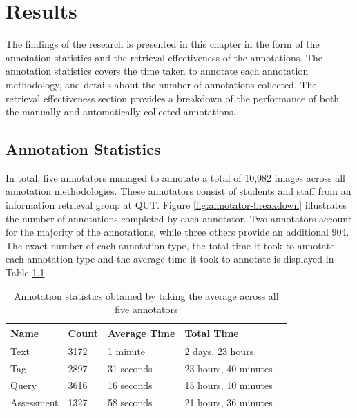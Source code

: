 \chapter{Results}\label{chapter:results}

The findings of the research is presented in this chapter in the form of the annotation statistics and the retrieval effectiveness of the annotations. The annotation statistics covers the time taken to annotate each annotation methodology, and details about the number of annotations collected. The retrieval effectiveness section provides a breakdown of the performance of both the manually and automatically collected annotations.

\section{Annotation Statistics}

In total, five annotators managed to annotate a total of 10,982 images across all annotation methodologies. These annotators consist of students and staff from an information retrieval group at QUT. Figure \ref{fig:annotator-breakdown} illustrates the number of annotations completed by each annotator. Two annotators account for the majority of the annotations, while three others provide an additional 904. The exact number of each annotation type, the total time it took to annotate each annotation type and the average time it took to annotate is displayed in Table \ref{table:annotation-stats}.

\begin{table}[b]
    \centering
    \begin{tabular}{ | l | l | l | l | p{5cm} |}
    \hline
    Name & Count & Average Time & Total Time \\ \hline
    Text & 3172 & 1 minute & 2 days, 23 hours \\ \hline
    Tag & 2897 & 31 seconds & 23 hours, 40 minutes \\ \hline
    Query & 3616 & 16 seconds & 15 hours, 10 minutes \\ \hline
    Assessment & 1327 & 58 seconds & 21 hours, 36 minutes \\ \hline
    \end{tabular}
    \caption{Annotation statistics obtained by taking the average across all five annotators}
    \label{table:annotation-stats}
\end{table}

